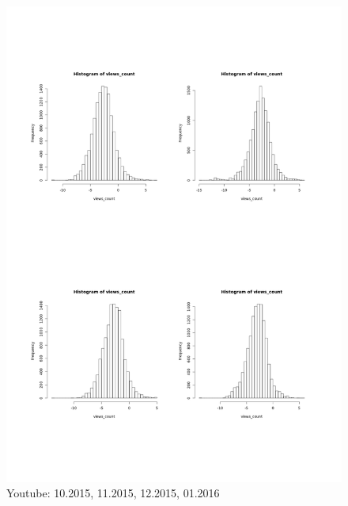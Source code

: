\documentclass{article}
\begin{document}
\begin{figure}[H]
\caption{Youtube: 10.2015, 11.2015, 12.2015, 01.2016}
\centering
\includegraphics[scale=0.7]{youtubeGauss}
\end{figure}
\end{document}
